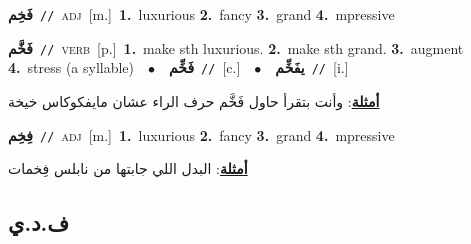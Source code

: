 \documentclass[10pt,a4paper,twoside]{article} %
\begin{document}
\begin{multicols}{2}
{\setlength\topsep{0pt}\textbf{\foreignlanguage{arabic}{فَخِم}}\ {\color{gray}\texttt{//}\color{black}}\ \textsc{adj}\ [m.]\ \textbf{1.}~luxurious  \textbf{2.}~fancy  \textbf{3.}~grand  \textbf{4.}~mpressive\ } \vspace{2mm}

{\setlength\topsep{0pt}\textbf{\foreignlanguage{arabic}{فَخَّم}}\ {\color{gray}\texttt{//}\color{black}}\ \textsc{verb}\ [p.]\ \textbf{1.}~make sth luxurious.  \textbf{2.}~make sth grand.  \textbf{3.}~augment  \textbf{4.}~stress (a syllable)\ \ $\bullet$\ \ \setlength\topsep{0pt}\textbf{\foreignlanguage{arabic}{فَخِّم}}\ {\color{gray}\texttt{//}\color{black}}\ [c.]\ \ $\bullet$\ \ \setlength\topsep{0pt}\textbf{\foreignlanguage{arabic}{يفَخِّم}}\ {\color{gray}\texttt{//}\color{black}}\ [i.]\  \begin{flushright}\color{gray}\foreignlanguage{arabic}{\textbf{\underline{\foreignlanguage{arabic}{أمثلة}}}: وأنت بتقرأ حاول فَخَّم حرف الراء عشان مايفكوكاس خيخة}\end{flushright}\color{black}} \vspace{2mm}

{\setlength\topsep{0pt}\textbf{\foreignlanguage{arabic}{فِخِم}}\ {\color{gray}\texttt{//}\color{black}}\ \textsc{adj}\ [m.]\ \textbf{1.}~luxurious  \textbf{2.}~fancy  \textbf{3.}~grand  \textbf{4.}~mpressive\  \begin{flushright}\color{gray}\foreignlanguage{arabic}{\textbf{\underline{\foreignlanguage{arabic}{أمثلة}}}: البدل اللي جابتها من نابلس فِخمات}\end{flushright}\color{black}} \vspace{2mm}

\vspace{-3mm}
\subsection*{\color{blue}\foreignlanguage{arabic}{ف.د.ي}\color{blue}{}} 


\end{multicols}
\end{document}
